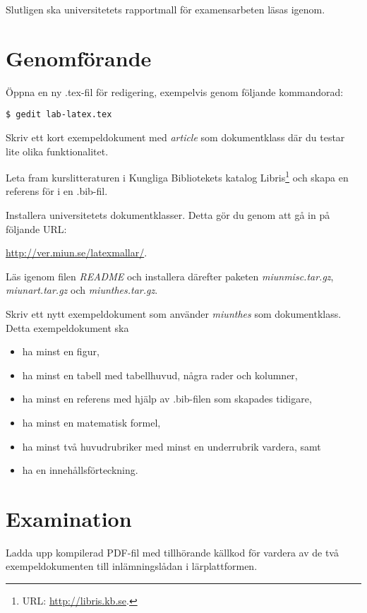 \documentclass[11pt,a4paper]{miunasgn}
\begin{document}
Slutligen ska universitetets rapportmall för examensarbeten \citep{MiUn2012rft} 
läsas igenom.


\section{Genomförande}
\label{sec:Genomforande}
\noindent
Öppna en ny .tex-fil för redigering, exempelvis genom följande kommandorad:
\begin{lstlisting}
$ gedit lab-latex.tex
\end{lstlisting}
Skriv ett kort exempeldokument med \emph{article} som dokumentklass där du 
testar lite olika funktionalitet.

Leta fram kurslitteraturen i Kungliga Bibliotekets katalog Libris\footnote{%
	URL: \url{http://libris.kb.se}.
} och skapa en referens för \BibTeX i en .bib-fil.

Installera universitetets dokumentklasser.
Detta gör du genom att gå in på följande URL:
\begin{center}
	\url{http://ver.miun.se/latexmallar/}.
\end{center}
Läs igenom filen \emph{README} och installera därefter paketen 
\emph{miunmisc.tar.gz}, \emph{miunart.tar.gz} och \emph{miunthes.tar.gz}.

Skriv ett nytt exempeldokument som använder \emph{miunthes} som dokumentklass.
Detta exempeldokument ska
\begin{itemize}
	\item ha minst en figur,
	\item ha minst en tabell med tabellhuvud, några rader och kolumner,
	\item ha minst en referens med hjälp av .bib-filen som skapades tidigare,
	\item ha minst en matematisk formel,
	\item ha minst två huvudrubriker med minst en underrubrik vardera, samt
	\item ha en innehållsförteckning.
\end{itemize}


\section{Examination}
\label{sec:Examination}
\noindent
Ladda upp kompilerad PDF-fil med tillhörande källkod för vardera av de två 
exempeldokumenten till inlämningslådan i lärplattformen.



\end{document}
